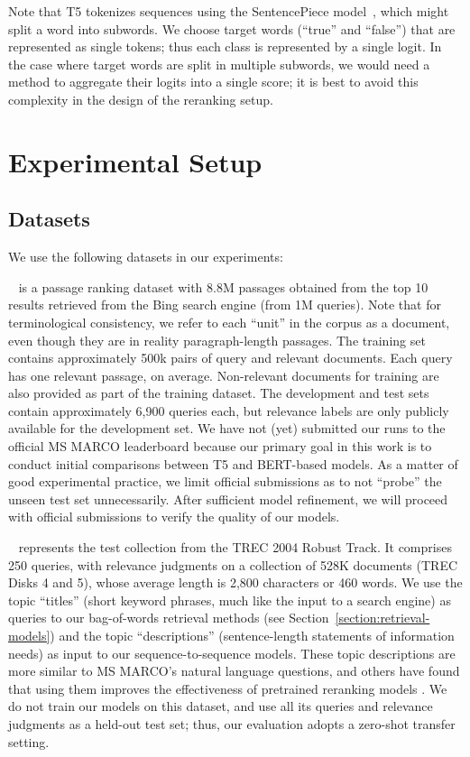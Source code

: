 \documentclass{article}
\begin{document}
Note that T5 tokenizes sequences using the SentencePiece model~\citep{kudo2018sentencepiece}, which might split a word into subwords.
We choose target words (``true'' and ``false'') that are represented as single tokens; thus each class is represented by a single logit.
In the case where target words are split in multiple subwords, we would need a method to aggregate their logits into a single score; it is best to avoid this complexity in the design of the reranking setup.

\section{Experimental Setup}

\subsection{Datasets}

We use the following datasets in our experiments:

\smallskip {}~\cite{nguyen2016ms} is a passage ranking dataset with 8.8M passages obtained from the top 10 results retrieved from the Bing search engine (from 1M queries).
Note that for terminological consistency, we refer to each ``unit'' in the corpus as a document, even though they are in reality paragraph-length passages.
The training set contains approximately 500k pairs of query and relevant documents.
Each query has one relevant passage, on average.
Non-relevant documents for training are also provided as part of the training dataset.
The development and test sets contain approximately 6,900 queries each, but relevance labels are only publicly available for the development set.
We have not (yet) submitted our runs to the official MS MARCO leaderboard because our primary goal in this work is to conduct initial comparisons between T5 and BERT-based models.
As a matter of good experimental practice, we limit official submissions as to not ``probe'' the unseen test set unnecessarily.
After sufficient model refinement, we will proceed with official submissions to verify the quality of our models.

\smallskip {}~\cite{voorhees2004overview} represents the test collection from the TREC 2004 Robust Track.
It comprises 250 queries, with relevance judgments on a collection of 528K documents (TREC Disks 4 and 5), whose average length is 2,800 characters or 460 words.
We use the topic ``titles'' (short keyword phrases, much like the input to a search engine) as queries to our bag-of-words retrieval methods (see Section~\ref{section:retrieval-models}) and the topic ``descriptions'' (sentence-length statements of information needs) as input to our sequence-to-sequence models.
These topic descriptions are more similar to MS MARCO's natural language questions, and others have found that using them improves the effectiveness of pretrained reranking models \cite{padakirethinking}.
We do not train our models on this dataset, and use all its queries and relevance judgments as a held-out test set; thus, our evaluation adopts a zero-shot transfer setting.
\end{document}
